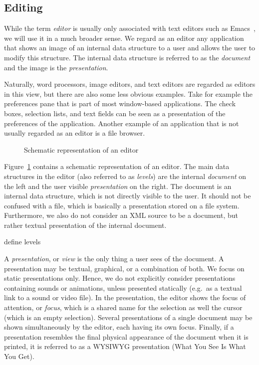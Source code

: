 \subsection{Editing}
\label{sect:editing}


While the term {\em editor} is usually only associated with text editors such as Emacs~\cite{stallman81emacs}, we will use it in a much broader sense. We regard as an editor any application that shows an image of an internal data structure to a user and allows the user to modify this structure. The internal data structure is referred to as the {\em document} and the image is the {\em presentation}. 

Naturally, word processors, image editors, and text editors are regarded as editors in this view, but there are also some less obvious examples. Take for example the preferences pane that is part of most window-based applications. The check boxes, selection lists, and text fields can be seen as a presentation of the preferences of the application. Another example of an application that is not usually regarded as an editor is a file browser.


\begin{figure}
\begin{small}
\begin{center}
\begin{center}
\end{center}\caption{Schematic representation of an editor}\label{editor} 
\end{center}
\end{small}
\end{figure}

Figure~\ref{editor} contains a schematic representation of an editor. The main data structures in the editor (also referred to as {\em levels}) are the internal {\em document} on the left and the user visible {\em presentation} on the right. The document is an internal data structure, which is not directly visible to the user. It should not be confused with a file, which is basically a presentation stored on a file system. Furthermore, we also do not consider an XML source to be a document, but rather textual presentation of the internal document.

\bc define levels \ec

A {\em presentation}, or {\em view} is the only thing a user sees of the document. A presentation may be textual, graphical, or a combination of both. We focus on static presentations only. Hence, we do not explicitly consider presentations containing sounds or animations, unless presented statically (e.g.\ as a textual link to a sound or video file). In the presentation, the editor shows the focus of attention, or {\em focus}, which is a shared name for the selection as well the cursor (which is an empty selection).  Several presentations of a single document may be shown simultaneously by the editor, each having its own focus. Finally, if a presentation resembles the final physical appearance of the document when it is printed, it is referred to as a WYSIWYG presentation (What You See Is What You Get).

